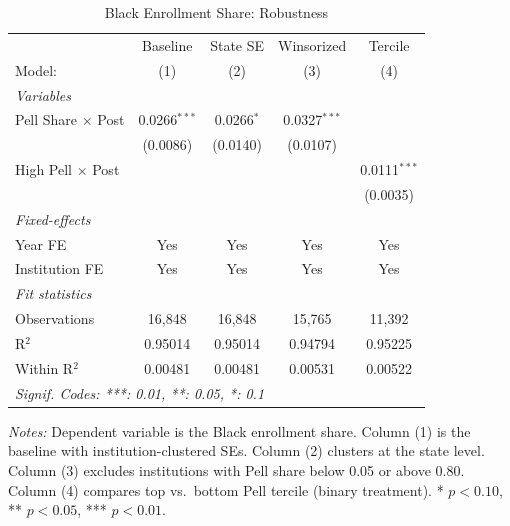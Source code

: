 
\begin{table}[htbp]
   \caption{\label{tab:robustness} Black Enrollment Share: Robustness}
   \centering
   \begin{tabular}{lcccc}
      \tabularnewline \midrule \midrule
                                & Baseline       & State SE     & Winsorized     & Tercile \\   
      Model:                    & (1)            & (2)          & (3)            & (4)\\  
      \midrule
      \emph{Variables}\\
      Pell Share $\times$ Post  & 0.0266$^{***}$ & 0.0266$^{*}$ & 0.0327$^{***}$ &   \\   
                                & (0.0086)       & (0.0140)     & (0.0107)       &   \\   
      High Pell $\times$ Post   &                &              &                & 0.0111$^{***}$\\   
                                &                &              &                & (0.0035)\\   
      \midrule
      \emph{Fixed-effects}\\
      Year FE                   & Yes            & Yes          & Yes            & Yes\\  
      Institution FE            & Yes            & Yes          & Yes            & Yes\\  
      \midrule
      \emph{Fit statistics}\\
      Observations              & 16,848         & 16,848       & 15,765         & 11,392\\  
      R$^2$                     & 0.95014        & 0.95014      & 0.94794        & 0.95225\\  
      Within R$^2$              & 0.00481        & 0.00481      & 0.00531        & 0.00522\\  
      \midrule \midrule
      \multicolumn{5}{l}{\emph{Signif. Codes: ***: 0.01, **: 0.05, *: 0.1}}\\
   \end{tabular}
   
   \par\vspace{0.3em}\begin{minipage}{\textwidth}\small 
   \textit{Notes:} Dependent variable is the Black enrollment share. Column (1) is the baseline with institution-clustered SEs. Column (2) clusters at the state level. Column (3) excludes institutions with Pell share below 0.05 or above 0.80. Column (4) compares top vs.\ bottom Pell tercile (binary treatment). * $p<0.10$, ** $p<0.05$, *** $p<0.01$.
\end{minipage}
\end{table}


